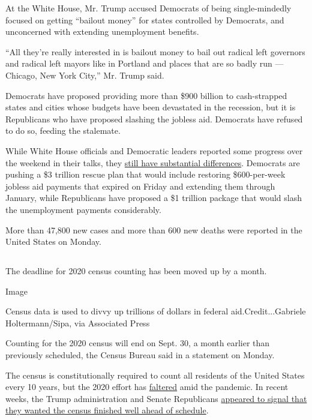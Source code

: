 At the White House, Mr. Trump accused Democrats of being single-mindedly
focused on getting ``bailout money'' for states controlled by Democrats,
and unconcerned with extending unemployment benefits.

``All they're really interested in is bailout money to bail out radical
left governors and radical left mayors like in Portland and places that
are so badly run --- Chicago, New York City,'' Mr. Trump said.

Democrats have proposed providing more than \$900 billion to
cash-strapped states and cities whose budgets have been devastated in
the recession, but it is Republicans who have proposed slashing the
jobless aid. Democrats have refused to do so, feeding the stalemate.

While White House officials and Democratic leaders reported some
progress over the weekend in their talks, they
\href{https://www.nytimes.com/2020/08/02/us/politics/coronavirus-jobless-aid.html}{still
have substantial differences}. Democrats are pushing a \$3 trillion
rescue plan that would include restoring \$600-per-week jobless aid
payments that expired on Friday and extending them through January,
while Republicans have proposed a \$1 trillion package that would slash
the unemployment payments considerably.

More than 47,800 new cases and more than 600 new deaths were reported in
the United States on Monday.

\hypertarget{-2}{%
\subsection{}\label{-2}}

The deadline for 2020 census counting has been moved up by a month.

Image

Census data is used to divvy up trillions of dollars in federal
aid.Credit...Gabriele Holtermann/Sipa, via Associated Press

Counting for the 2020 census will end on Sept. 30, a month earlier than
previously scheduled, the Census Bureau said in a statement on Monday.

The census is constitutionally required to count all residents of the
United States every 10 years, but the 2020 effort has
\href{https://www.nytimes.com/2020/04/18/us/coronavirus-census.html}{faltered}
amid the pandemic. In recent weeks, the Trump administration and Senate
Republicans
\href{https://www.nytimes.com/2020/07/28/us/trump-census.html}{appeared
to signal that they wanted the census finished well ahead of schedule}.

